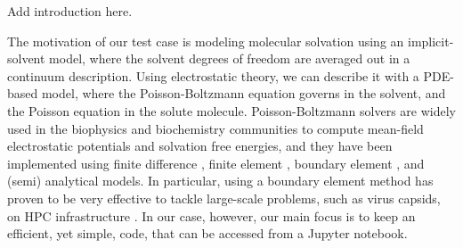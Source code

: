 Add introduction here.


The motivation of our test case is modeling molecular solvation using an implicit-solvent model, where the solvent degrees of freedom are averaged out in a continuum description.
Using electrostatic theory, we can describe it with a PDE-based model, where the Poisson-Boltzmann equation governs in the solvent, and the Poisson equation in the solute molecule.
Poisson-Boltzmann solvers are widely used in the biophysics and biochemistry communities to compute mean-field electrostatic potentials and solvation free energies, and they have been implemented using finite difference \cite{delphi, apbs}, finite element \cite{apbs}, boundary element \cite{afmpb, tabi, pygbe}, and (semi) analytical \cite{thg} models. 
In particular, using a boundary element method has proven to be very effective to tackle large-scale problems, such as virus capsids, on HPC infrastructure \cite{lu}.
In our case, however, our main focus is to keep an efficient, yet simple, code, that can be accessed from a Jupyter notebook.
